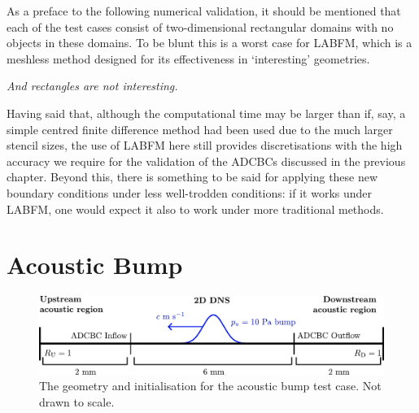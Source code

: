 As a preface to the following numerical validation, it should be mentioned that each of the test cases consist of two-dimensional rectangular domains with no objects in these domains. To be blunt this is a worst case for LABFM, which is a meshless method designed for its effectiveness in `interesting' geometries.

\emph{And rectangles are not interesting.}

Having said that, although the computational time may be larger than if, say, a simple centred finite difference method had been used due to the much larger stencil sizes, the use of LABFM here still provides discretisations with the high accuracy we require for the validation of the ADCBCs discussed in the previous chapter. Beyond this, there is something to be said for applying these new boundary conditions under less well-trodden conditions: if it works under LABFM, one would expect it also to work under more traditional methods.





\section{Acoustic Bump}

\begin{figure}[t]
\centering
\includegraphics[scale=0.65]{assets/imgs/adcbc_bump_test.pdf}
\caption{The geometry and initialisation for the acoustic bump test case. Not drawn to scale.}
\label{fig:ac-bump-test}
\end{figure}

